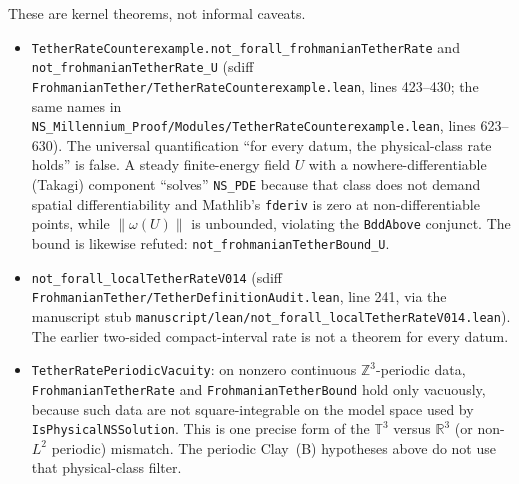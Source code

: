 \documentclass[11pt]{article}
\theoremstyle{plain}
\theoremstyle{definition}
\theoremstyle{remark}
\newcommand{\Tthree}{\mathbb{T}^{3}}
\newcommand{\R}{\mathbb{R}}
\begin{document}
These are kernel theorems, not informal caveats.
{\sloppy\begin{itemize}[leftmargin=1.4em]
\item \texttt{TetherRateCounterexample.\hspace{0pt}not\_\hspace{0pt}forall\_\hspace{0pt}frohmanianTetherRate} and \texttt{not\_\hspace{0pt}frohmanianTetherRate\_\hspace{0pt}U} (sdiff \texttt{FrohmanianTether/\hspace{0pt}TetherRateCounterexample.\hspace{0pt}lean}, lines 423--430; the same names in \texttt{NS\_\hspace{0pt}Millennium\_\hspace{0pt}Proof/\hspace{0pt}Modules/\hspace{0pt}TetherRateCounterexample.\hspace{0pt}lean}, lines 623--630). The universal quantification ``for every datum, the physical-class rate holds'' is false. A steady finite-energy field \(U\) with a nowhere-differentiable (Takagi) component ``solves'' \texttt{NS\_PDE} because that class does not demand spatial differentiability and Mathlib's \texttt{fderiv} is zero at non-differentiable points, while \(\|\omega(U)\|\) is unbounded, violating the \texttt{BddAbove} conjunct. The bound is likewise refuted: \texttt{not\_\hspace{0pt}frohmanianTetherBound\_\hspace{0pt}U}.
\item \texttt{not\_\hspace{0pt}forall\_\hspace{0pt}localTetherRateV014} (sdiff \texttt{FrohmanianTether/\hspace{0pt}TetherDefinitionAudit.\hspace{0pt}lean}, line 241, via the manuscript stub \texttt{manuscript/\hspace{0pt}lean/\hspace{0pt}not\_\hspace{0pt}forall\_\hspace{0pt}localTetherRateV014.\hspace{0pt}lean}). The earlier two-sided compact-interval rate is not a theorem for every datum.
\item \texttt{TetherRatePeriodicVacuity}: on nonzero continuous \(\mathbb{Z}^{3}\)-periodic data, \texttt{FrohmanianTetherRate} and \texttt{FrohmanianTetherBound} hold only vacuously, because such data are not square-integrable on the model space used by \texttt{IsPhysicalNSSolution}. This is one precise form of the \(\Tthree\) versus \(\R^{3}\) (or non-\(L^{2}\) periodic) mismatch. The periodic Clay~(B) hypotheses above do not use that physical-class filter.

\end{itemize}}
\end{document}

